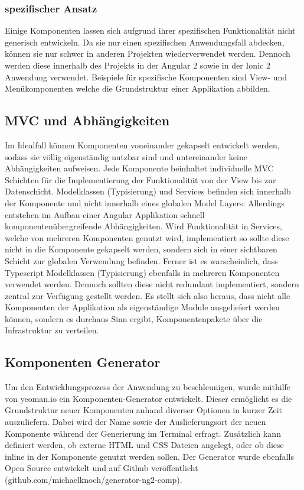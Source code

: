 \subsubsection{spezifischer Ansatz}

Einige Komponenten lassen sich aufgrund ihrer spezifischen Funktionalität nicht generisch entwickeln.
Da sie nur einen spezifischen Anwendungsfall abdecken, können sie nur schwer in anderen Projekten wiederverwendet werden.
Dennoch werden diese innerhalb des Projekts \projectname{}
in der Angular 2 sowie in der Ionic 2 Anwendung verwendet.
Beispiele für spezifische Komponenten sind View- und Menükomponenten welche die Grundstruktur einer Applikation abbilden.

\subsection{MVC und Abhängigkeiten}

Im Idealfall können Komponenten voneinander gekapselt entwickelt werden,
sodass sie völlig eigenständig nutzbar sind und untereinander keine Abhängigkeiten aufweisen.
Jede Komponente beinhaltet individuelle \ac{MVC} Schichten für die Implementierung der Funktionalität von der View bis zur Datenschicht.
Modelklassen (Typisierung) und Services befinden sich innerhalb der Komponente und nicht innerhalb eines globalen Model Layers.
Allerdings entstehen im Aufbau einer Angular Applikation schnell komponentenübergreifende Abhängigkeiten.
Wird Funktionalität in Services, welche von mehreren Komponenten genutzt wird, implementiert
so sollte diese nicht in die Komponente gekapselt werden, sondern sich in einer sichtbaren Schicht zur globalen Verwendung befinden.
Ferner ist es warscheinlich, dass Typescript Modelklassen (Typisierung) ebenfalls in mehreren Komponenten verwendet werden.
Dennoch sollten diese nicht redundant implementiert,
sondern zentral zur Verfügung gestellt werden. Es stellt sich also heraus,
dass nicht alle Komponenten der Applikation \projectname{} als eigenständige Module ausgeliefert werden können,
sondern es durchaus Sinn ergibt, Komponentenpakete über die Infrastruktur zu verteilen.


\subsection{Komponenten Generator}

Um den Entwicklungsprozess der Anwendung zu beschleunigen, wurde mithilfe von yeoman.io ein Komponenten-Generator entwickelt.
Dieser ermöglicht es die Grundstruktur neuer Komponenten anhand diverser Optionen in kurzer Zeit auszuliefern.
Dabei wird der Name sowie der Auslieferungsort der neuen Komponente während der Generierung im Terminal erfragt.
Zusätzlich kann definiert werden, ob externe \ac{HTML} und \ac{CSS} Dateien angelegt, oder ob diese inline in der Komponente genutzt werden sollen.
Der Generator wurde ebenfalls Open Source entwickelt und auf Github veröffentlicht
(github.com/michaelknoch/generator-ng2-comp).

